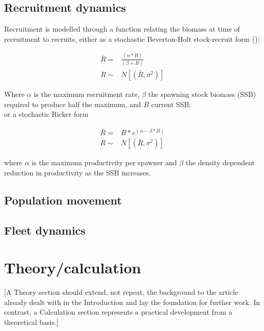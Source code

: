 \documentclass[review]{elsarticle}
\begin{document}
\subsection{Recruitment dynamics}

Recruitment is modelled through a function relating the biomass at time of
recruitment to recruits, either as a stochastic Beverton-Holt stock-recruit
form (\cite{Beverton1957}): 

\begin{equation*}
	\begin{split}
	\bar{R} = & \frac{(\alpha * B)}{(\beta + B)} \\
	     R \sim & N[(\bar{R},\sigma^2)]
	\end{split}
\end{equation*}

Where $\alpha$ is the maximum recruitment rate, $\beta$ the spawning stock biomass (SSB)
required to produce half the maximum, and $B$ current SSB; \\

or a stochastic Ricker form \cite{Ricker1954}

\begin{equation*}
	\begin{split}
	\bar{R} = & B * e^{(\alpha - \beta * B)} \\	
   	     R \sim & N[(\bar{R},\sigma^2)]
	\end{split}
\end{equation*}

where $\alpha$ is the maximum productivity per spawner and $\beta$ the density dependent
reduction in productivity as the SSB increases.



\subsection{Population movement}



\subsection{Fleet dynamics}




\section{Theory/calculation}

[A Theory section should extend, not repeat, the background to the article
already dealt with in the Introduction and lay the foundation for further work.
In contrast, a Calculation section represents a practical development from a
theoretical basis.]
\end{document}
